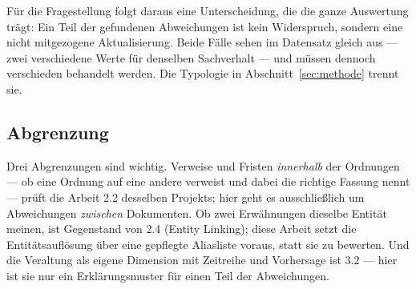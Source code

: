 Für die Fragestellung folgt daraus eine Unterscheidung, die die ganze Auswertung trägt: Ein
Teil der gefundenen Abweichungen ist kein Widerspruch, sondern eine nicht mitgezogene
Aktualisierung. Beide Fälle sehen im Datensatz gleich aus --- zwei verschiedene Werte für
denselben Sachverhalt --- und müssen dennoch verschieden behandelt werden. Die Typologie in
Abschnitt~\ref{sec:methode} trennt sie.

\subsection{Abgrenzung}

Drei Abgrenzungen sind wichtig. Verweise und Fristen \emph{innerhalb} der Ordnungen --- ob
eine Ordnung auf eine andere verweist und dabei die richtige Fassung nennt --- prüft die
Arbeit 2.2 desselben Projekts; hier geht es ausschließlich um Abweichungen \emph{zwischen}
Dokumenten. Ob zwei Erwähnungen dieselbe Entität meinen, ist Gegenstand von 2.4 (Entity
Linking); diese Arbeit setzt die Entitätsauflösung über eine gepflegte Aliasliste voraus,
statt sie zu bewerten. Und die Veraltung als eigene Dimension mit Zeitreihe und Vorhersage
ist 3.2 --- hier ist sie nur ein Erklärungsmuster für einen Teil der Abweichungen.

